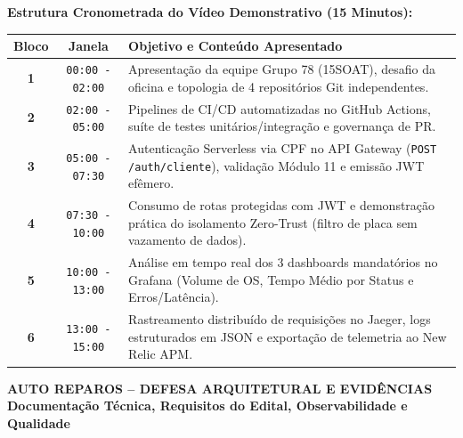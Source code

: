 \documentclass[9pt,a4paper]{article}
\begin{document}
\vspace{-0.1cm}

\begin{tcolorbox}[subtlebox]
    \footnotesize
    \textbf{\color{primary} Estrutura Cronometrada do Vídeo Demonstrativo (15 Minutos):}\par\vspace{0.08cm}
    \begin{tabularx}{\textwidth}{c|c|X}
        \textbf{Bloco} & \textbf{Janela} & \textbf{Objetivo e Conteúdo Apresentado} \\
        \hline
        \textbf{1} & \texttt{00:00 - 02:00} & Apresentação da equipe Grupo 78 (15SOAT), desafio da oficina e topologia de 4 repositórios Git independentes. \\
        \textbf{2} & \texttt{02:00 - 05:00} & Pipelines de CI/CD automatizadas no GitHub Actions, suíte de testes unitários/integração e governança de PR. \\
        \textbf{3} & \texttt{05:00 - 07:30} & Autenticação Serverless via CPF no API Gateway (\texttt{POST /auth/cliente}), validação Módulo 11 e emissão JWT efêmero. \\
        \textbf{4} & \texttt{07:30 - 10:00} & Consumo de rotas protegidas com JWT e demonstração prática do isolamento Zero-Trust (filtro de placa sem vazamento de dados). \\
        \textbf{5} & \texttt{10:00 - 13:00} & Análise em tempo real dos 3 dashboards mandatórios no Grafana (Volume de OS, Tempo Médio por Status e Erros/Latência). \\
        \textbf{6} & \texttt{13:00 - 15:00} & Rastreamento distribuído de requisições no Jaeger, logs estruturados em JSON e exportação de telemetria ao New Relic APM. \\
    \end{tabularx}
\end{tcolorbox}

\newpage


\begin{center}
    {\Large \textbf{\color{primary} AUTO REPAROS -- DEFESA ARQUITETURAL E EVIDÊNCIAS}} \\
    \vspace{0.08cm}
    {\small \textbf{\color{accentblue}Documentação Técnica, Requisitos do Edital, Observabilidade e Qualidade}}
\end{center}
\end{document}
